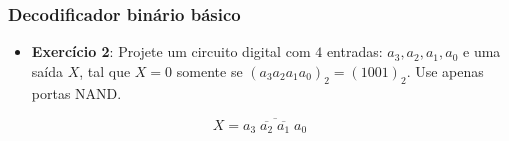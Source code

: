 \documentclass{beamer}
\newcommand{\Not}[1]{\overline{#1}}
\begin{document}
\begin{frame}
\frametitle{Decodificador binário básico}

\begin{itemize}
\item \textbf{Exercício 2}: Projete um circuito digital com $4$ entradas:
$a_3, a_2, a_1, a_0$ e uma saída $X$, tal que $X = 0$ somente se $(a_3  a_2  a_1 a_0)_2 = (1001)_2$. Use apenas portas NAND.
\end{itemize}


\pause
$$X = \Not{a_3 \; \Not{a_2} \; \Not{a_1} \; a_0}$$

\pause

\begin{center}
%
%
\end{center}

\end{frame}
\end{document}
